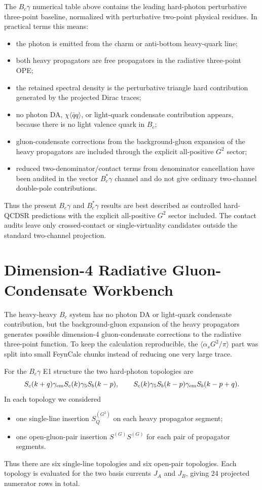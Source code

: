 \documentclass[11pt]{article}
\newcommand{\Bc}{B_c}
\begin{document}
The \(B_c\gamma\) numerical table above contains the leading hard-photon
perturbative three-point baseline, normalized with perturbative two-point
physical residues.  In practical terms this means:
\begin{itemize}
  \item the photon is emitted from the charm or anti-bottom heavy-quark line;
  \item both heavy propagators are free propagators in the radiative
  three-point OPE;
  \item the retained spectral density is the perturbative triangle hard
  contribution generated by the projected Dirac traces;
  \item no photon DA, \(\chi\langle\bar q q\rangle\), or light-quark condensate
  contribution appears, because there is no light valence quark in \(B_c\);
  \item gluon-condensate corrections from the background-gluon expansion of the
  heavy propagators are included through the explicit all-positive \(G^2\)
  sector;
  \item reduced two-denominator/contact terms from denominator cancellation
  have been audited in the vector \(B_c^\ast\gamma\) channel and do not give
  ordinary two-channel double-pole contributions.
\end{itemize}
Thus the present \(B_c\gamma\) and \(B_c^\ast\gamma\) results are best described
as controlled hard-QCDSR predictions with the explicit all-positive \(G^2\)
sector included.  The contact audits leave only crossed-contact or
single-virtuality candidates outside the standard two-channel projection.

\section{Dimension-4 Radiative Gluon-Condensate Workbench}

The heavy-heavy \(B_c\) system has no photon DA or light-quark condensate
contribution, but the background-gluon expansion of the heavy propagators
generates possible dimension-4 gluon-condensate corrections to the radiative
three-point function.  To keep the calculation reproducible, the
\(\langle\alpha_s G^2/\pi\rangle\) part was split into small FeynCalc chunks
instead of reducing one very large trace.

For the \(\Bc\gamma\) E1 structure the two hard-photon topologies are
\[
S_c(k+q)\gamma_{\rm em}S_c(k)\gamma_5S_b(k-p),
\qquad
S_c(k)\gamma_5S_b(k-p)\gamma_{\rm em}S_b(k-p+q).
\]
In each topology we considered
\begin{itemize}
  \item one single-line insertion \(S_Q^{(G^2)}\) on each heavy propagator
  segment;
  \item one open-gluon-pair insertion \(S^{(G)}S^{(G)}\) for each pair of
  propagator segments.
\end{itemize}
Thus there are six single-line topologies and six open-pair topologies.  Each
topology is evaluated for the two basis currents \(J_A\) and \(J_B\), giving
24 projected numerator rows in total.
\end{document}
